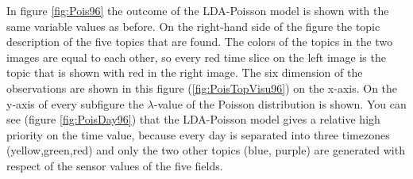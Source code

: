 In figure \ref{fig:Pois96} the outcome of the LDA-Poisson model is shown with the same variable values as before. On the right-hand side of the figure the topic description of the five topics that are found. The colors of the topics in the two images are equal to each other, so every red time slice on the left image is the topic that is shown with red in the right image. The six dimension of the observations are shown in this figure (\ref{fig:PoisTopVisu96}) on the x-axis. On the y-axis of every subfigure the $\lambda$-value of the Poisson distribution is shown. You can see (figure \ref{fig:PoisDay96}) that the LDA-Poisson model gives a relative high priority on the time value, because every day is separated into three timezones (yellow,green,red) and only the two other topics (blue, purple) are generated with respect of the sensor values of the five fields.

